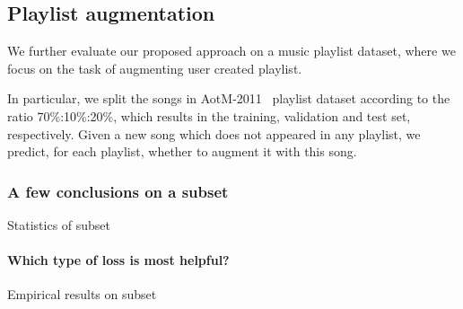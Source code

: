 \subsection{Playlist augmentation}

We further evaluate our proposed approach on a music playlist dataset, 
where we focus on the task of augmenting user created playlist.

In particular, we split the songs in AotM-2011~\cite{mcfee2012hypergraph} playlist dataset
according to the ratio 70\%:10\%:20\%, which results in the training, validation and test set, respectively.
Given a new song which does not appeared in any playlist, 
we predict, for each playlist, whether to augment it with this song.

\newpage

\subsubsection{A few conclusions on a subset}
Statistics of subset \\


\paragraph{Which type of loss is most helpful?}
Empirical results on subset \\

